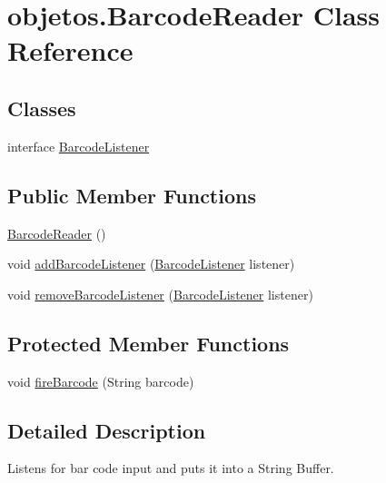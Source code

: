 \hypertarget{classobjetos_1_1_barcode_reader}{}\section{objetos.\+Barcode\+Reader Class Reference}
\label{classobjetos_1_1_barcode_reader}
\subsection*{Classes}
\begin{DoxyCompactItemize}
\item 
interface \mbox{\hyperlink{interfaceobjetos_1_1_barcode_reader_1_1_barcode_listener}{Barcode\+Listener}}
\end{DoxyCompactItemize}
\subsection*{Public Member Functions}
\begin{DoxyCompactItemize}
\item 
\mbox{\hyperlink{classobjetos_1_1_barcode_reader_a0dc943983b8313727f52c7e043805a80}{Barcode\+Reader}} ()
\item 
void \mbox{\hyperlink{classobjetos_1_1_barcode_reader_a7c0a8f3e684c72a78005c97f3d9cdc24}{add\+Barcode\+Listener}} (\mbox{\hyperlink{interfaceobjetos_1_1_barcode_reader_1_1_barcode_listener}{Barcode\+Listener}} listener)
\item 
void \mbox{\hyperlink{classobjetos_1_1_barcode_reader_a4b49668d25796160e591b78b89b287eb}{remove\+Barcode\+Listener}} (\mbox{\hyperlink{interfaceobjetos_1_1_barcode_reader_1_1_barcode_listener}{Barcode\+Listener}} listener)
\end{DoxyCompactItemize}
\subsection*{Protected Member Functions}
\begin{DoxyCompactItemize}
\item 
void \mbox{\hyperlink{classobjetos_1_1_barcode_reader_a1cd53567cad388b796e540c7a9240bf7}{fire\+Barcode}} (String barcode)
\end{DoxyCompactItemize}


\subsection{Detailed Description}
Listens for bar code input and puts it into a String Buffer. 


